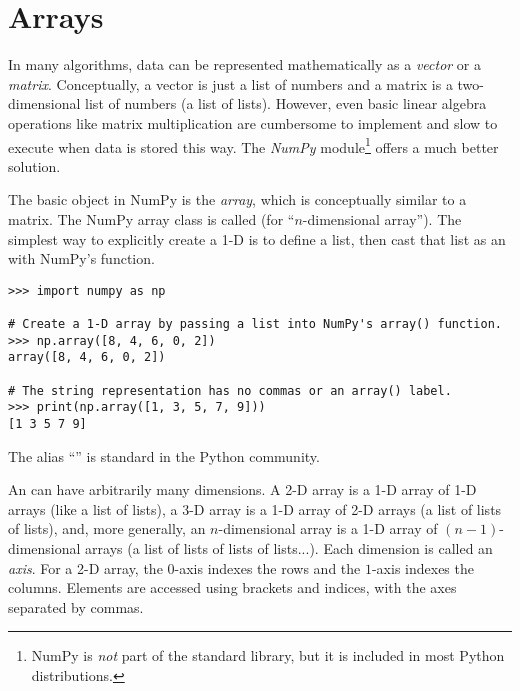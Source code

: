 \label{lab:NumPy}

\section*{Arrays} %

In many algorithms, data can be represented mathematically as a \emph{vector} or a \emph{matrix}.
Conceptually, a vector is just a list of numbers and a matrix is a two-dimensional list of numbers (a list of lists).
However, even basic linear algebra operations like matrix multiplication are cumbersome to implement and slow to execute when data is stored this way.
The \emph{NumPy} module\footnote{NumPy is \emph{not} part of the standard library, but it is included in most Python distributions.} offers a much better solution.

The basic object in NumPy is the \emph{array}, which is conceptually similar to a matrix.
The NumPy array class is called  (for ``$n$-dimensional array'').
The simplest way to explicitly create a 1-D  is to define a list, then cast that list as an  with NumPy's  function.

\begin{lstlisting}
>>> import numpy as np

# Create a 1-D array by passing a list into NumPy's array() function.
>>> np.array([8, 4, 6, 0, 2])
array([8, 4, 6, 0, 2])

# The string representation has no commas or an array() label.
>>> print(np.array([1, 3, 5, 7, 9]))
[1 3 5 7 9]
\end{lstlisting}
%
The alias ``'' is standard in the Python community. %

An  can have arbitrarily many dimensions.
A 2-D array is a 1-D array of 1-D arrays (like a list of lists), a 3-D array is a 1-D array of 2-D arrays (a list of lists of lists), and, more generally, an $n$-dimensional array is a 1-D array of $(n-1)$-dimensional arrays (a list of lists of lists of lists...).
Each dimension is called an \emph{axis}.
For a 2-D array, the $0$-axis indexes the rows and the $1$-axis indexes the columns.
Elements are accessed using brackets and indices, with the axes separated by commas.

